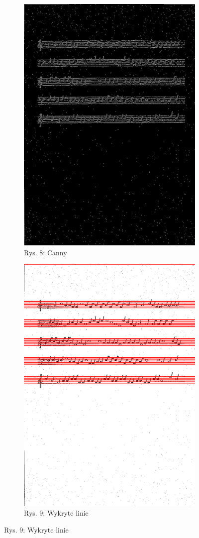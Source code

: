 \documentclass[11pt]{article}
\begin{document}
\begin{figure}[H]
    \centering
    \captionsetup[subfigure]{labelformat=empty}
    \begin{subfigure}{.5\textwidth}
        \centering
        \graphicspath{ {staffs/} }
        \includegraphics[width=.7\linewidth]{staffs4_canny.png}
        \caption{Rys. 8: Canny}
        \label{fig:sub1}
    \end{subfigure}%
    \hfill
    \begin{subfigure}{.5\textwidth}
        \centering
        \graphicspath{ {staffs/} }
        \includegraphics[width=.7\linewidth]{staffs4_lines.png}
        \caption{Rys. 9: Wykryte linie}
        \label{fig:sub2}
    \end{subfigure}
    \label{fig:test}
\end{figure}
\end{document}
